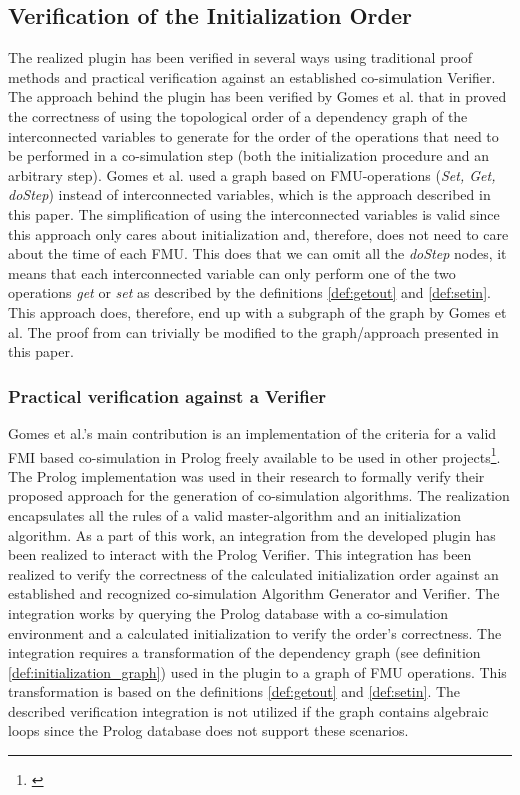 \subsection{Verification of the Initialization Order}
The realized plugin has been verified in several ways using traditional proof methods and practical verification against an established co-simulation Verifier. The approach behind the plugin has been verified by Gomes et al. that in \cite{gomes_lucio_vangheluwe_2019} proved the correctness of using the topological order of a dependency graph of the interconnected variables to generate for the order of the operations that need to be performed in a co-simulation step (both the initialization procedure and an arbitrary step). Gomes et al. used a graph based on FMU-operations (\textit{Set, Get, doStep}) instead of interconnected variables, which is the approach described in this paper. The simplification of using the interconnected variables is valid since this approach only cares about initialization and, therefore, does not need to care about the time of each FMU. This does that we can omit all the \textit{doStep} nodes, it means that each interconnected variable can only perform one of the two operations \textit{get} or \textit{set} as described by the definitions \ref{def:getout} and \ref{def:setin}.
This approach does, therefore, end up with a subgraph of the graph by Gomes et al. The proof from \cite{gomes_lucio_vangheluwe_2019} can trivially be modified to the graph/approach presented in this paper.

\subsubsection{Practical verification against a Verifier} 
Gomes et al.'s main contribution is an implementation of the criteria for a valid FMI based co-simulation in Prolog freely available to be used in other projects\footnote{\url{}}. The Prolog implementation was used in their research to formally verify their proposed approach for the generation of co-simulation algorithms. The realization encapsulates all the rules of a valid master-algorithm and an initialization algorithm. As a part of this work, an integration from the developed plugin has been realized to interact with the Prolog Verifier. This integration has been realized to verify the correctness of the calculated initialization order against an established and recognized co-simulation Algorithm Generator and Verifier. The integration works by querying the Prolog database with a co-simulation environment and a calculated initialization to verify the order's correctness. The integration requires a transformation of the dependency graph (see definition \ref{def:initialization_graph}) used in the plugin to a graph of FMU operations. This transformation is based on the definitions \ref{def:getout} and \ref{def:setin}. The described verification integration is not utilized if the graph contains algebraic loops since the Prolog database does not support these scenarios.

